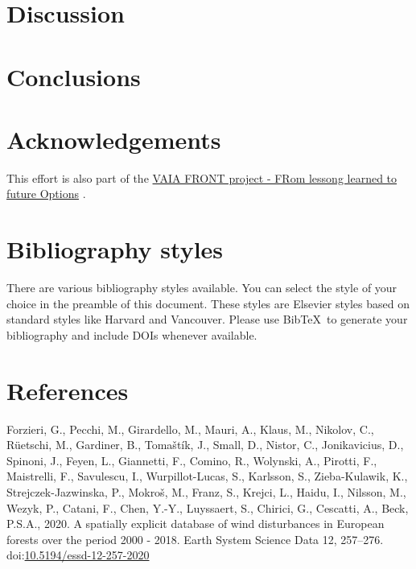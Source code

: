 \documentclass[smallextended]{svjour3}       %
\begin{document}
\hypertarget{discussion}{%
\section{Discussion}\label{discussion}}

\hypertarget{conclusions}{%
\section{Conclusions}\label{conclusions}}

\hypertarget{acknowledgements}{%
\section{Acknowledgements}\label{acknowledgements}}

This effort is also part of the
\href{https://www.tesaf.unipd.it/ricerca/progetti-dip-tesaf}{VAIA FRONT
project - FRom lessong learned to future Options} .

\hypertarget{bibliography-styles}{%
\section{Bibliography styles}\label{bibliography-styles}}

There are various bibliography styles available. You can select the
style of your choice in the preamble of this document. These styles are
Elsevier styles based on standard styles like Harvard and Vancouver.
Please use BibTeX~to generate your bibliography and include DOIs
whenever available.

\hypertarget{references}{%
\section*{References}\label{references}}

\hypertarget{refs}{}
\leavevmode\hypertarget{ref-Forzieri2020}{}%
Forzieri, G., Pecchi, M., Girardello, M., Mauri, A., Klaus, M., Nikolov,
C., Rüetschi, M., Gardiner, B., Tomaštík, J., Small, D., Nistor, C.,
Jonikavicius, D., Spinoni, J., Feyen, L., Giannetti, F., Comino, R.,
Wolynski, A., Pirotti, F., Maistrelli, F., Savulescu, I.,
Wurpillot-Lucas, S., Karlsson, S., Zieba-Kulawik, K.,
Strejczek-Jazwinska, P., Mokroš, M., Franz, S., Krejci, L., Haidu, I.,
Nilsson, M., Wezyk, P., Catani, F., Chen, Y.-Y., Luyssaert, S., Chirici,
G., Cescatti, A., Beck, P.S.A., 2020. A spatially explicit database of
wind disturbances in European forests over the period 2000 - 2018. Earth
System Science Data 12, 257--276.
doi:\href{https://doi.org/10.5194/essd-12-257-2020}{10.5194/essd-12-257-2020}
\end{document}
